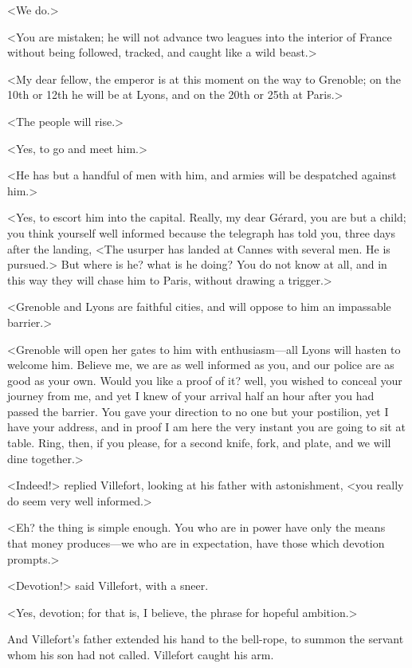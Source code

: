  <We do.> 

 <You are mistaken; he will not advance two leagues into the interior of France without being followed, tracked, and caught like a wild beast.> 

 <My dear fellow, the emperor is at this moment on the way to Grenoble; on the 10th or 12th he will be at Lyons, and on the 20th or 25th at Paris.> 

 <The people will rise.> 

 <Yes, to go and meet him.> 

 <He has but a handful of men with him, and armies will be despatched against him.> 

 <Yes, to escort him into the capital. Really, my dear Gérard, you are but a child; you think yourself well informed because the telegraph has told you, three days after the landing, <The usurper has landed at Cannes with several men. He is pursued.> But where is he? what is he doing? You do not know at all, and in this way they will chase him to Paris, without drawing a trigger.> 

 <Grenoble and Lyons are faithful cities, and will oppose to him an impassable barrier.> 

 <Grenoble will open her gates to him with enthusiasm—all Lyons will hasten to welcome him. Believe me, we are as well informed as you, and our police are as good as your own. Would you like a proof of it? well, you wished to conceal your journey from me, and yet I knew of your arrival half an hour after you had passed the barrier. You gave your direction to no one but your postilion, yet I have your address, and in proof I am here the very instant you are going to sit at table. Ring, then, if you please, for a second knife, fork, and plate, and we will dine together.> 

 <Indeed!> replied Villefort, looking at his father with astonishment, <you really do seem very well informed.> 

 <Eh? the thing is simple enough. You who are in power have only the means that money produces—we who are in expectation, have those which devotion prompts.> 

 <Devotion!> said Villefort, with a sneer. 

 <Yes, devotion; for that is, I believe, the phrase for hopeful ambition.> 

 And Villefort's father extended his hand to the bell-rope, to summon the servant whom his son had not called. Villefort caught his arm. 

